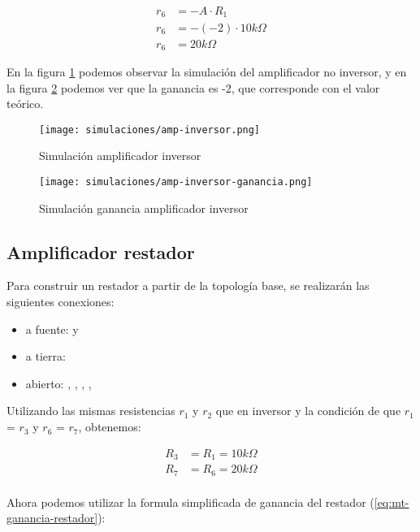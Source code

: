 \begin{align*}
    r_6 &= -A \cdot R_1 \\
    r_6 &= - (-2) \cdot 10k\Omega \\
    r_6 &= 20k\Omega
\end{align*}

En la figura \ref{fig:sim-amp-inversor} podemos observar la simulación del amplificador no inversor, y en la figura \ref{fig:sim-amp-inversor-ganancia} podemos ver que la ganancia es -2, que corresponde con el valor teórico.

\begin{figure}[ht]
    \centering
    \texttt{[image: simulaciones/amp-inversor.png]}
    \caption{Simulación amplificador inversor}
    \label{fig:sim-amp-inversor}
\end{figure}

\begin{figure}[ht]
    \centering
    \texttt{[image: simulaciones/amp-inversor-ganancia.png]}
    \caption{Simulación ganancia amplificador inversor}
    \label{fig:sim-amp-inversor-ganancia}
\end{figure}

\subsection{Amplificador restador}

Para construir un restador a partir de la topología base, se realizarán las siguientes conexiones:

\begin{itemize}
    \item a fuente:  y 
    \item a tierra: 
    \item abierto: , , , , 
\end{itemize}

\newcommand{\res}[1]{$r_{#1}$}

Utilizando las mismas resistencias \res{1} y \res{2} que en inversor  y la condición de que \res{1} = \res{3} y \res{6} = \res{7}, obtenemos:  

\begin{align*}
    R_3 &= R_1 = 10k\Omega \\
    R_7 &= R_6 = 20k\Omega \\
\end{align*}

Ahora podemos utilizar la formula simplificada de ganancia del restador (\ref{eq:mt-ganancia-restador}):


